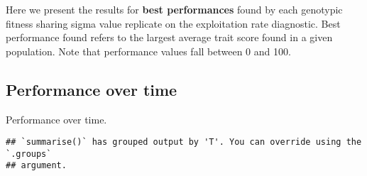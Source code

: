 \documentclass[]{book}
\newenvironment{Shaded}{\begin{snugshade}}{\end{snugshade}}
\newcommand{\DataTypeTok}[1]{\textcolor[rgb]{0.13,0.29,0.53}{#1}}
\newcommand{\KeywordTok}[1]{\textcolor[rgb]{0.13,0.29,0.53}{\textbf{#1}}}
\newcommand{\NormalTok}[1]{#1}
\newcommand{\OperatorTok}[1]{\textcolor[rgb]{0.81,0.36,0.00}{\textbf{#1}}}
\newcommand{\StringTok}[1]{\textcolor[rgb]{0.31,0.60,0.02}{#1}}
\begin{document}
Here we present the results for \textbf{best performances} found by each genotypic fitness sharing sigma value replicate on the exploitation rate diagnostic.
Best performance found refers to the largest average trait score found in a given population.
Note that performance values fall between 0 and 100.

\hypertarget{performance-over-time-2}{%
\subsection{Performance over time}\label{performance-over-time-2}}

Performance over time.

\begin{Shaded}
\end{Shaded}

\begin{verbatim}
## `summarise()` has grouped output by 'T'. You can override using the `.groups`
## argument.
\end{verbatim}
\end{document}
